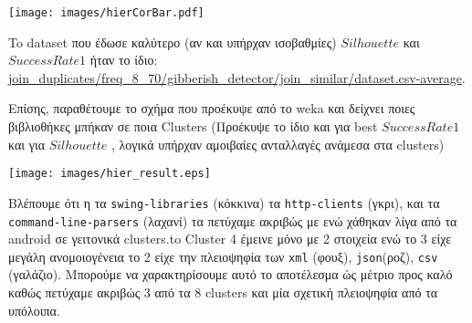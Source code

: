 \noindent\begin{minipage}{\linewidth}
    \centering
    \texttt{[image: images/hierCorBar.pdf]}
    \label{fig:CorrelationHier}
\end{minipage}

To dataset που έδωσε καλύτερο (αν και υπήρχαν ισοβαθμίες) $Silhouette$ και $Success Rate 1$ ήταν το ίδιο:
\url{join_duplicates/freq_8_70/gibberish_detector/join_similar/dataset.csv-average}.

\begin{minipage}{\linewidth}
    \centering
    \label{table:best-hier}
\end{minipage}

Επίσης, παραθέτουμε το σχήμα που προέκυψε από το weka και δείχνει ποιες
βιβλιοθήκες μπήκαν σε ποια Clusters (Προέκυψε το ίδιο και για best $Success Rate 1$ και για $Silhouette$ , λογικά υπήρχαν αμοιβαίες ανταλλαγές ανάμεσα στα clusters)

\noindent\begin{minipage}{\linewidth}
    \centering
    \texttt{[image: images/hier\_result.eps]}
    \label{fig:clustering}
\end{minipage}

Βλέπουμε ότι η τα \texttt{swing-libraries} (κόκκινα) τα \texttt{http-clients} (γκρι), 
και τα \texttt{command-line-parsers} (λαχανί) τα πετύχαμε ακριβώς με ενώ χάθηκαν 
λίγα από τα android σε γειτονικά clusters.to Cluster 4 έμεινε μόνο με 2 στοιχεία ενώ το 3 είχε μεγάλη ανομοιογένεια το 2 είχε την πλειοψηφία των \texttt{xml} (φουξ), \texttt{json}(ροζ), \texttt{csv} (γαλάζιο).
Μπορούμε να χαρακτηρίσουμε αυτό το αποτέλεσμα ώς μέτριο προς καλό
καθώς πετύχαμε ακριβώς 3 από τα 8 clusters και μία σχετική πλειοψηφία από τα υπόλοιπα.

